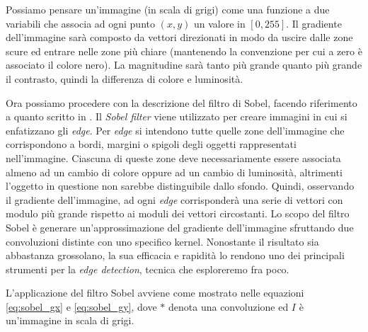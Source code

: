 Possiamo pensare un'immagine (in scala di grigi) come una funzione a due variabili che associa ad ogni punto $(x,y)$ un valore in $[0,255]$.
Il gradiente dell'immagine sarà composto da vettori direzionati in modo da uscire dalle zone scure ed entrare nelle zone più chiare (mantenendo la convenzione per cui a zero è associato il colore nero).
La magnitudine sarà tanto più grande quanto più grande il contrasto, quindi la differenza di colore e luminosità.

Ora possiamo procedere con la descrizione del filtro di Sobel, facendo riferimento a quanto scritto in \cite{wikipedia-sobel}.
Il \textit{Sobel filter} viene utilizzato per creare immagini in cui si enfatizzano gli \textit{edge}.
Per \textit{edge} si intendono tutte quelle zone dell'immagine che corrispondono a bordi, margini o spigoli degli oggetti rappresentati nell'immagine.
Ciascuna di queste zone deve necessariamente essere associata almeno ad un cambio di colore oppure ad un cambio di luminosità, altrimenti l'oggetto in questione non sarebbe distinguibile dallo sfondo.
Quindi, osservando il gradiente dell'immagine, ad ogni \textit{edge} corrisponderà una serie di vettori con modulo più grande rispetto ai moduli dei vettori circostanti.
Lo scopo del filtro Sobel è generare un'approssimazione del gradiente dell'immagine sfruttando due convoluzioni distinte con uno specifico kernel.
Nonostante il risultato sia abbastanza grossolano, la sua efficacia e rapidità lo rendono uno dei principali strumenti per la \textit{edge detection}, tecnica che esploreremo fra poco.

L'applicazione del filtro Sobel avviene come mostrato nelle equazioni \ref{eq:sobel_gx} e \ref{eq:sobel_gy}, dove $*$ denota una convoluzione ed $I$ è un'immagine in scala di grigi.

